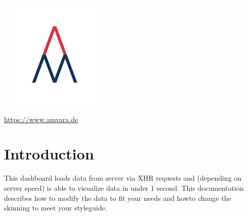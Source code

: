 \documentclass[12pt]{article}
\begin{document}
\maketitle %

\begin{centering} %
	\includegraphics{amvara} \par
	\url{https://www.amvara.de} \par
\end{centering}

\newpage %
\tableofcontents %
\newpage


\section{Introduction} %
This dashboard loads data from server via XHR requests and (depending on server speed) is able to visualize data in under 1 second. This documentation describes how to modify the data to fit your needs and howto change the skinning to meet your styleguide.
\end{document}
